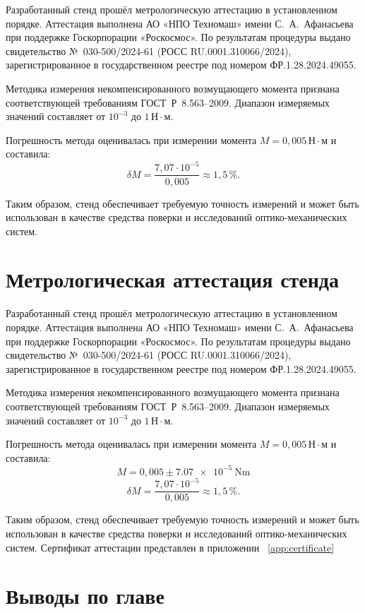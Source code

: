 Разработанный стенд прошёл метрологическую аттестацию в установленном порядке. 
Аттестация выполнена АО «НПО Техномаш» имени С.~А.~Афанасьева при поддержке 
Госкорпорации «Роскосмос». По результатам процедуры выдано свидетельство 
№~030-500/2024-61 (РОСС RU.0001.310066/2024), зарегистрированное в государственном 
реестре под номером ФР.1.28.2024.49055.

Методика измерения некомпенсированного возмущающего момента признана 
соответствующей требованиям ГОСТ~Р~8.563--2009. Диапазон измеряемых значений 
составляет от $10^{-3}$ до $1 \,\text{Н}\cdot\text{м}$.  

Погрешность метода оценивалась при измерении момента 
$M = 0{,}005 \,\text{Н}\cdot\text{м}$ и составила:
\[
\delta M = \frac{7{,}07 \cdot 10^{-5}}{0{,}005} \approx 1{,}5 \,\%.
\]

Таким образом, стенд обеспечивает требуемую точность измерений 
и может быть использован в качестве средства поверки и исследований 
оптико-механических систем.

\section{Метрологическая аттестация стенда}

Разработанный стенд прошёл метрологическую аттестацию в установленном порядке. 
Аттестация выполнена АО «НПО Техномаш» имени С.~А.~Афанасьева при поддержке 
Госкорпорации «Роскосмос». По результатам процедуры выдано свидетельство 
№~030-500/2024-61 (РОСС RU.0001.310066/2024), зарегистрированное в государственном 
реестре под номером ФР.1.28.2024.49055.

Методика измерения некомпенсированного возмущающего момента признана 
соответствующей требованиям ГОСТ~Р~8.563--2009. Диапазон измеряемых значений 
составляет от $10^{-3}$ до $1 \,\text{Н}\cdot\text{м}$.  

Погрешность метода оценивалась при измерении момента 
$M = 0{,}005 \,\text{Н}\cdot\text{м}$ и составила:
\[
M = 0,005 \pm \SI{7,07e-5}{\newton\meter} 
\]
\[
\delta M = \frac{7{,}07 \cdot 10^{-5}}{0{,}005} \approx 1{,}5 \,\%.
\]

Таким образом, стенд обеспечивает требуемую точность измерений 
и может быть использован в качестве средства поверки и исследований 
оптико-механических систем. Сертификат аттестации представлен в приложении ~\cref{app:certificate}


\section*{Выводы по главе}

